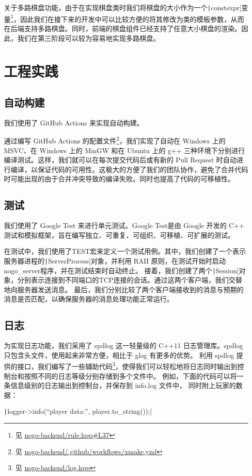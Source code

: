 \documentclass[UTF8]{ctexart}
\begin{document}
关于多路棋盘功能，由于在实现棋盘类时我们将棋盘的大小作为一个\texttt|constexpr|变量\footnote{见 \href{https://github.com/The-Goo-Goo-Gang/nogo-backend/blob/main/rule.hpp\#L37}{\url{nogo-backend/rule.hpp\#L37}}}，因此我们在接下来的开发中可以比较方便的将其修改为类的模板参数，从而在后端支持多路棋盘。同时，前端的棋盘组件已经支持了任意大小棋盘的渲染。因此，我们在第三阶段可以较为容易地实现多路棋盘。\par
\section{工程实践}
\subsection{自动构建}
我们使用了 GitHub Actions 来实现自动构建。\par
通过编写 GitHub Actions 的配置文件\footnote{见 \href{https://github.com/The-Goo-Goo-Gang/nogo-backend/blob/main/.github/workflows/xmake.yml}{\url{nogo-backend/.github/workflows/xmake.yml}}}，我们实现了自动在 Windows 上的 MSVC、在 Windows 上的 MinGW 和在 Ubuntu 上的 g++ 三种环境下分别进行编译测试。这样，我们就可以在每次提交代码后或有新的 Pull Request 时自动进行编译，以保证代码的可用性。这极大的方便了我们的团队协作，避免了合并代码时可能出现的由于合并冲突导致的编译失败。同时也提高了代码的可移植性。\par
\subsection{测试}

我们使用了 Google Test 来进行单元测试。Google Test是由 Google 开发的 C++ 测试和模拟框架，旨在编写独立、可重复、可组织、可移植、可扩展的测试。\par
在测试中，我们使用了TEST宏来定义一个测试用例。其中，我们创建了一个表示服务器进程的\texttt|ServerProcess|对象，并利用 RAII 原则，在测试开始时启动nogo_server程序，并在测试结束时自动终止。
接着，我们创建了两个\texttt|Session|对象，分别表示连接到不同端口的TCP连接的会话。通过这两个客户端，我们交替地向服务器发送消息。
最后，我们分别比较了两个客户端接收到的消息与预期的消息是否匹配，以确保服务器的消息处理功能正常运行。

\subsection{日志}
为实现日志功能，我们采用了 spdlog 这一轻量级的 C++11 日志管理库。spdlog 只包含头文件，使用起来非常方便，相比于 glog 有更多的优势。
利用 spdlog 提供的接口，我们编写了一些辅助代码\footnote{见 \href{https://github.com/The-Goo-Goo-Gang/nogo-backend/blob/main/log.hpp}{\url{nogo-backend/log.hpp}}}，使得我们可以轻松地将日志同时输出到控制台和按照不同的日志等级分别存储到多个文件中。
例如，下面的代码可以将一条信息级别的日志输出到控制台，并保存到 info.log 文件中，
同时附上玩家的数据：\par 
\begin{center} 
	\texttt|logger->info(“player data:{}”, player.to_string());| 
\end{center} \par
\end{document}
